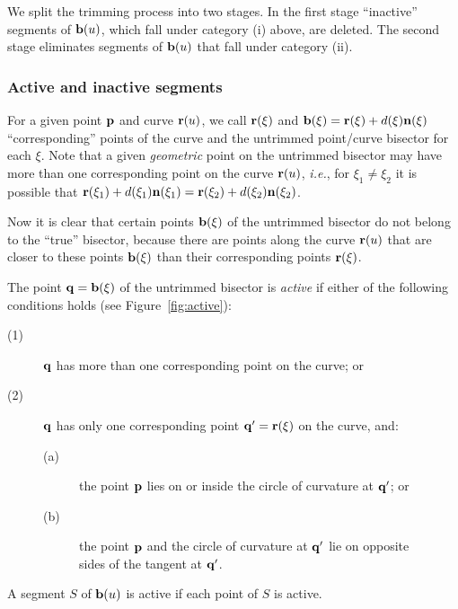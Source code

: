 We split the trimming process into two stages. In the first
stage ``inactive'' segments of ${\bf b}(u)$, which fall under
category (i) above, are deleted. The second stage eliminates
segments of ${\bf b}(u)$ that fall under category (ii).

\subsubsection{Active and inactive segments}

For a given point ${\bf p}$ and curve ${\bf r}(u)$, we call
${\bf r}(\xi)$ and ${\bf b}(\xi)={\bf r}(\xi)+d(\xi){\bf n}(\xi)$
``corresponding'' points of the curve and the untrimmed point/curve
bisector for each $\xi$. Note that a given {\it geometric\/} point
on the untrimmed bisector may have more than one corresponding
point on the curve ${\bf r}(u)$, {\it i.e.}, for $\xi_1\not=\xi_2$
it is possible that ${\bf r}(\xi_1)+d(\xi_1){\bf n}(\xi_1)={\bf r}
(\xi_2)+d(\xi_2){\bf n}(\xi_2)$.

Now it is clear that certain points ${\bf b}(\xi)$ of the untrimmed
bisector do not belong to the ``true'' bisector, because there are
points along the curve ${\bf r}(u)$ that are closer to these points
${\bf b}(\xi)$ than their corresponding points ${\bf r}(\xi)$.

\begin{dfn} \label{dfn:active}
{\rm
The point ${\bf q}={\bf b}(\xi)$ of the untrimmed bisector
is {\it active\/} if either of the following conditions holds
(see Figure~\ref{fig:active}):
\begin{description}
\item[{\rm (1)}]
        ${\bf q}$ has more than one corresponding point on
        the curve; or
\item[{\rm (2)}]
        ${\bf q}$ has only one corresponding point ${\bf q}'
        ={\bf r}(\xi)$ on the curve, and:
\begin{description}
\item[{\rm (a)}]
        the point ${\bf p}$ lies on or inside the circle of
        curvature at ${\bf q}'$; or
\item[{\rm (b)}]
        the point ${\bf p}$ and the circle of curvature at
        ${\bf q}'$ lie on opposite \\ sides of the tangent
        at ${\bf q}'$.
\end{description}
\end{description}
A segment $S$ of ${\bf b}(u)$ is active if each point of $S$
is active. }
\end{dfn}


